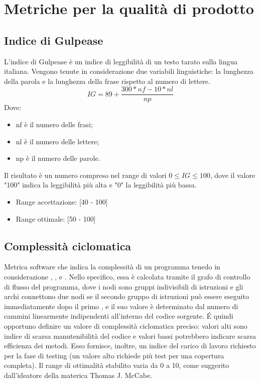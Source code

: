 \section{Metriche per la qualità di prodotto}
\subsection{Indice di Gulpease}
 L'indice di Gulpease è un indice di leggibilità di un testo tarato sulla lingua italiana. Vengono tenute in considerazione due variabili linguistiche:  la lunghezza della parola e la lunghezza della frase rispetto al numero di lettere.
\[ IG = 89+ \frac{300*nf - 10*nl}{np} \]
Dove:
\begin{itemize}
	\item nf è il numero delle frasi;
	\item nl è il numero delle lettere;
	\item np è il numero delle parole.
\end{itemize}
Il risultato è un numero compreso nel range di valori $0 \le{IG} \le{100}$, dove il valore "100" indica la leggibilità più alta e "0" la leggibilità più bassa.
\begin{itemize}
	\item Range accettazione: [40 - 100]
	\item Range ottimale: [50 - 100]
\end{itemize}
\subsection{Complessità ciclomatica}
Metrica software che indica la complessità di un programma tenedo in considerazione , ,  e .
Nello specifico, essa è calcolata tramite il grafo di controllo di flusso del programma, dove i nodi sono gruppi indivisibili di istruzioni e gli archi connettono due nodi se il secondo gruppo di istruzioni può essere eseguito immediatamente dopo il primo , e il suo valore è determinato dal numero di cammini linearmente indipendenti all'interno del codice sorgente. 
\'E quindi opportuno definire un valore di complessità ciclomatica preciso: valori alti sono indice di scarsa manutenibilità del codice e valori bassi potrebbero indicare scarsa efficienza dei metodi.
Esso fornisce, inoltre, un indice del carico di lavoro richiesto per la fase di testing (un valore alto richiede più test per una copertura completa).
Il range di ottimalità stabilito varia da 0 a 10, come suggerito dall'ideatore della materica Thomas J. McCabe.  

